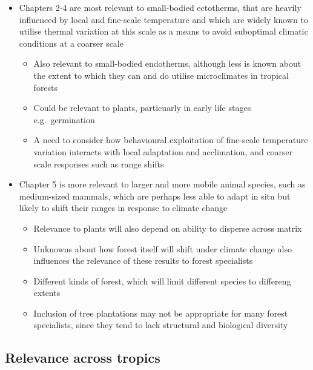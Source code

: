 \documentclass[12pt,a4paper,]{report}
\providecommand{\tightlist}{%
  \setlength{\itemsep}{0pt}\setlength{\parskip}{0pt}}
\theoremstyle{definition}
\theoremstyle{definition}
\theoremstyle{definition}
\theoremstyle{remark}
\begin{document}
\begin{itemize}
\tightlist
\item
  Chapters 2-4 are most relevant to small-bodied ectotherms, that are
  heavily influenced by local and fine-scale temperature and which are
  widely known to utilise thermal variation at this scale as a means to
  avoid suboptimal climatic conditions at a coarser scale

  \begin{itemize}
  \tightlist
  \item
    Also relevant to small-bodied endotherms, although less is known
    about the extent to which they can and do utilise microclimates in
    tropical forests
  \item
    Could be relevant to plants, particuarly in early life stages
    e.g.~germination
  \item
    A need to consider how behavioural exploitation of fine-scale
    temperature variation interacts with local adaptation and
    acclimation, and coarser scale responses such as range shifts
  \end{itemize}
\item
  Chapter 5 is more relevant to larger and more mobile animal species,
  such as medium-sized mammals, which are perhaps less able to adapt in
  situ but likely to shift their ranges in response to climate change

  \begin{itemize}
  \tightlist
  \item
    Relevance to plants will also depend on ability to disperse across
    matrix
  \item
    Unknowns about how forest itself will shift under climate change
    also influences the relevance of these results to forest specialists
  \item
    Different kinds of forest, which will limit different species to
    differeng extents
  \item
    Inclusion of tree plantations may not be appropriate for many forest
    specialists, since they tend to lack structural and biological
    diversity
  \end{itemize}
\end{itemize}

\subsection{Relevance across tropics}\label{relevance-across-tropics}
\end{document}
